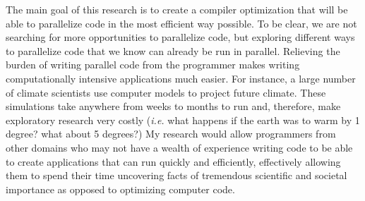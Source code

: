 \documentclass[a4paper,12pt]{article}
\begin{document}



The main goal of this research is to create a compiler optimization that will be able to parallelize code in the most efficient way possible. To be clear, we are not searching for more opportunities to parallelize code, but exploring different ways to parallelize code that we know can already be run in parallel. Relieving the burden of writing parallel code from the programmer makes writing computationally intensive applications much easier. For instance, a large number of climate scientists use computer models to project future climate. These simulations take anywhere from weeks to months to run and, therefore, make exploratory research very costly (\emph{i.e.} what happens if the earth was to warm by 1 degree? what about 5 degrees?) My research would allow programmers from other domains who may not have a wealth of experience writing code to be able to create applications that can run quickly and efficiently, effectively allowing them to spend their time uncovering facts of tremendous scientific and societal importance as opposed to optimizing computer code.
\end{document}
